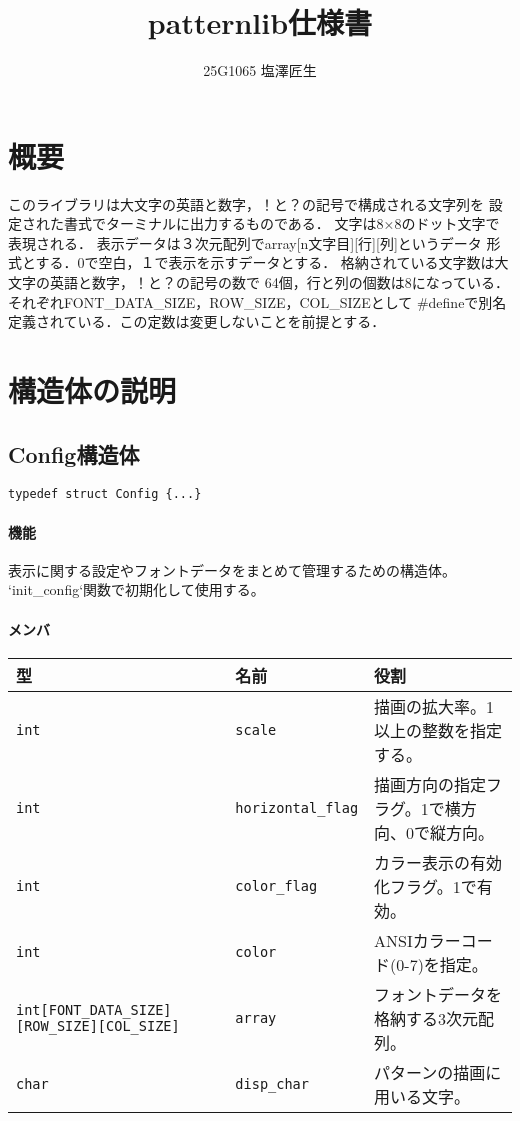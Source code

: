 \documentclass[uplatex]{jsarticle}
\begin{document}
\title{patternlib仕様書}
\author{25G1065 塩澤匠生}

\maketitle






\section{概要}

このライブラリは大文字の英語と数字，！と？の記号で構成される文字列を
設定された書式でターミナルに出力するものである．
文字は8×8のドット文字で表現される．
表示データは３次元配列でarray[n文字目][行][列]というデータ
形式とする．0で空白，１で表示を示すデータとする．
格納されている文字数は大文字の英語と数字，！と？の記号の数で
64個，行と列の個数は8になっている．
それぞれFONT\_DATA\_SIZE，ROW\_SIZE，COL\_SIZEとして
\#defineで別名定義されている．この定数は変更しないことを前提とする．

\section{構造体の説明}
\subsection{Config構造体}
\texttt{typedef struct Config \{...\}}
\paragraph{機能}
表示に関する設定やフォントデータをまとめて管理するための構造体。
`init\_config`関数で初期化して使用する。

\paragraph{メンバ}
\begin{center}
    \begin{tabular}{|l|l|p{5.5cm}|}
        \hline
        \textbf{型} & \textbf{名前} & \textbf{役割} \\ \hline
        \texttt{int} & \texttt{scale} & 描画の拡大率。1以上の整数を指定する。 \\ \hline
        \texttt{int} & \texttt{horizontal\_flag} & 描画方向の指定フラグ。1で横方向、0で縦方向。 \\ \hline
        \texttt{int} & \texttt{color\_flag} & カラー表示の有効化フラグ。1で有効。 \\ \hline
        \texttt{int} & \texttt{color} & ANSIカラーコード(0-7)を指定。 \\ \hline
        \texttt{int[FONT\_DATA\_SIZE][ROW\_SIZE][COL\_SIZE]} & \texttt{array} & フォントデータを格納する3次元配列。 \\ \hline
        \texttt{char} & \texttt{disp\_char} & パターンの描画に用いる文字。 \\ \hline
    \end{tabular}
\end{center}
\end{document}
